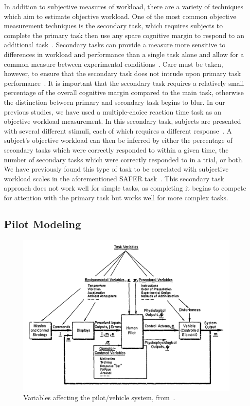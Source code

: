 In addition to subjective measures of workload, there are a variety of techniques which aim to estimate objective workload.
One of the most common objective measurement techniques is the secondary task, which requires subjects to complete the primary task then use any spare cognitive margin to respond to an additional task~\citep{gawron_human_2008}.
Secondary tasks can provide a measure more sensitive to differences in workload and performance than a single task alone and allow for a common measure between experimental conditions~\citep{slocum1971meaningful}.
Care must be taken, however, to ensure that the secondary task does not intrude upon primary task performance~\citep{williges_behavioral_1979}.
It is important that the secondary task requires a relatively small percentage of the overall cognitive margin compared to the main task, otherwise the distinction between primary and secondary task begins to blur.
In our previous studies, we have used a multiple-choice reaction time task as an objective workload measurement.
In this secondary task, subjects are presented with several different stimuli, each of which requires a different response~\citep{lysaght_operator_1989}.
A subject's objective workload can then be inferred by either the percentage of secondary tasks which were correctly responded to within a given time, the number of secondary tasks which were correctly responded to in a trial, or both.
We have previously found this type of task to be correlated with subjective workload scales in the aforementioned SAFER task~\citep{karasinski_real-time_2017}.
This secondary task approach does not work well for simple tasks, as completing it begins to compete for attention with the primary task but works well for more complex tasks.

\subsection{Pilot Modeling}
\label{background:pilotmodeling}

\begin{figure}[!b]
    \begin{center}
        \includegraphics[width=0.8\linewidth]{figures/Introduction/Screen_Shot_2018-07-25_at_10_37_08_AM.png}
        \caption[Variables affecting the pilot/vehicle system]{Variables affecting the pilot/vehicle system, from~\citet{mcruer_mathematical_1974}.}
        \label{figure:mcruer1974}
    \end{center}
\end{figure}

